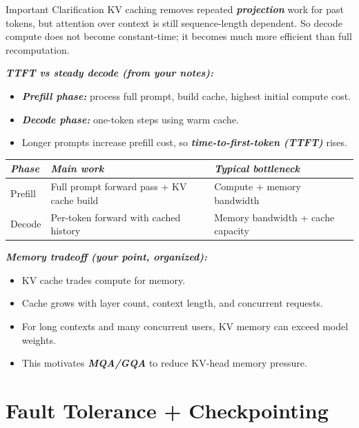 \documentclass[12pt]{article}
\let\origtextbf\textbf
\renewcommand{\textbf}[1]{\origtextbf{\textit{#1}}}
\begin{document}
\begin{redbox}{Important Clarification}
KV caching removes repeated \textbf{projection} work for past tokens, but attention over context is still sequence-length dependent.  
So decode compute does not become constant-time; it becomes much more efficient than full recomputation.
\end{redbox}

\textbf{TTFT vs steady decode (from your notes):}
\begin{itemize}
\item \textbf{Prefill phase:} process full prompt, build cache, highest initial compute cost.
\item \textbf{Decode phase:} one-token steps using warm cache.
\item Longer prompts increase prefill cost, so \textbf{time-to-first-token (TTFT)} rises.
\end{itemize}

{\footnotesize
\begin{tabularx}{\textwidth}{|>{\raggedright\arraybackslash}p{2.5cm}|X|X|}
\hline
\textbf{Phase} & \textbf{Main work} & \textbf{Typical bottleneck} \\
\hline
Prefill & Full prompt forward pass + KV cache build & Compute + memory bandwidth \\
\hline
Decode & Per-token forward with cached history & Memory bandwidth + cache capacity \\
\hline
\end{tabularx}
}

\textbf{Memory tradeoff (your point, organized):}
\begin{itemize}
\item KV cache trades compute for memory.
\item Cache grows with layer count, context length, and concurrent requests.
\item For long contexts and many concurrent users, KV memory can exceed model weights.
\item This motivates \textbf{MQA/GQA} to reduce KV-head memory pressure.
\end{itemize}



\section{Fault Tolerance + Checkpointing}
\end{document}
